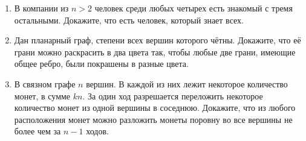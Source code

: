 \documentclass{article}
\begin{document}
\begin{enumerate}[label*=\protect\fbox{\arabic{enumi}}]
\item В компании из $n > 2$ человек среди любых четырех есть знакомый с тремя остальными.
Докажите, что есть человек, который знает всех.

\item Дан планарный граф, степени всех вершин которого чётны. Докажите, что её грани можно раскрасить в два цвета так, чтобы любые две грани, имеющие общее ребро, были покрашены в разные цвета.

\item В связном графе $n$ вершин. В каждой из них лежит некоторое количество монет, в сумме
$kn$. За один ход разрешается переложить некоторое количество монет из одной вершины
в соседнюю. Докажите, что из любого расположения монет можно разложить монеты поровну во все вершины не более чем за $n - 1$ ходов.
 
\end{enumerate}
\end{document}
